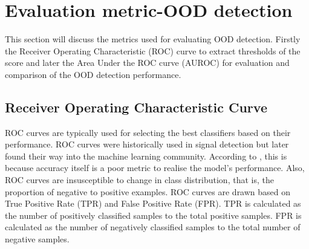 \section{Evaluation metric-OOD detection}
This section will discuss the metrics used for evaluating OOD detection. Firstly the Receiver Operating Characteristic (ROC) curve to extract thresholds of the score and later the Area Under the ROC curve (AUROC) for evaluation and comparison of the OOD detection performance.
\subsection{Receiver Operating Characteristic Curve}
ROC curves are typically used for selecting the best classifiers based on their performance.
ROC curves were historically used in signal detection but later found their way into the machine learning community.
According to \cite{ROC_example}, this is because accuracy itself is a poor metric to realise the model's performance.
Also, ROC curves are insusceptible to change in class distribution, that is, the proportion of negative to positive examples.
ROC curves are drawn based on True Positive Rate (TPR) and False Positive Rate (FPR).
TPR is calculated as the number of positively classified samples to the total positive samples. FPR is calculated as the number of negatively classified samples to the total number of negative samples.

